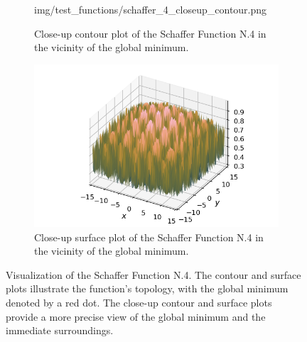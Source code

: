\begin{figure}[ht!]
\begin{subfigure}[b]{0.45\textwidth}
        {img/test_functions/schaffer_4_closeup_contour.png}
      \caption{
        Close-up contour plot of the Schaffer Function N.4 in the vicinity of
        the global minimum.
      }
    \end{subfigure}
    \hfill
    \begin{subfigure}[b]{0.45\textwidth}
      \centering
      \includegraphics[width=\textwidth]
        {img/test_functions/schaffer_4_closeup_surface.png}
      \caption{
        Close-up surface plot of the Schaffer Function N.4 in the vicinity of
        the global minimum.
      }
    \end{subfigure}
    \caption{
      Visualization of the Schaffer Function N.4.
      The contour and surface plots illustrate the function's topology, with the
      global minimum denoted by a red dot.
      The close-up contour and surface plots provide a more precise view of the 
      global minimum and the immediate surroundings.
    }
    \label{fig:app:test:schaffer_4}
  \end{figure}
